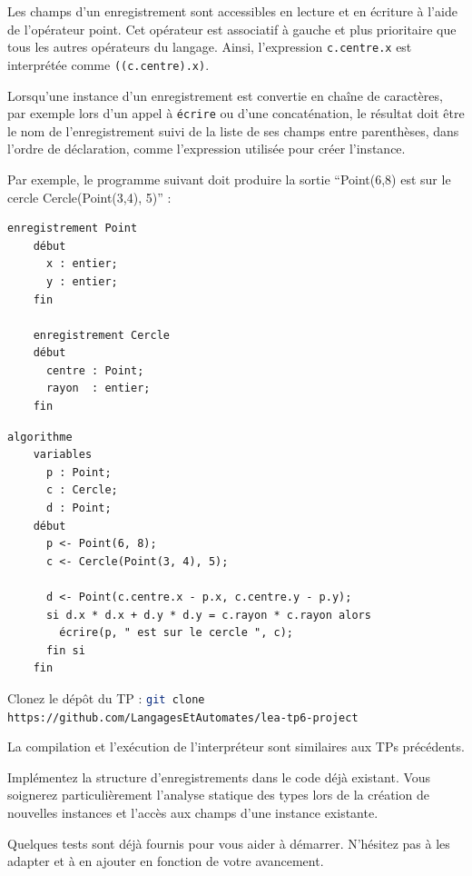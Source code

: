 \documentclass[correction]{td}
\begin{document}
Les champs d'un enregistrement sont accessibles en lecture et en écriture à l'aide de l'opérateur point.
Cet opérateur est associatif à gauche et plus prioritaire que tous les autres opérateurs du langage.
Ainsi, l'expression \lstinline{c.centre.x} est interprétée comme \lstinline{((c.centre).x)}.

Lorsqu'une instance d'un enregistrement est convertie en chaîne de caractères,
par exemple lors d'un appel à \lstinline{écrire} ou d'une concaténation,
le résultat doit être le nom de l'enregistrement suivi de la liste de ses
champs entre parenthèses, dans l'ordre de déclaration,
comme l'expression utilisée pour créer l'instance.

Par exemple, le programme suivant doit produire la sortie ``Point(6,8) est sur le cercle Cercle(Point(3,4), 5)'' :

\begin{minipage}{.3\textwidth}
  \begin{lstlisting}[gobble=2]
    enregistrement Point
    début
      x : entier;
      y : entier;
    fin
    
    enregistrement Cercle
    début
      centre : Point;
      rayon  : entier;
    fin
  \end{lstlisting}
\end{minipage}%
\begin{minipage}{.7\textwidth}
  \begin{lstlisting}[gobble=2]
    algorithme
    variables
      p : Point;
      c : Cercle;
      d : Point;
    début
      p <- Point(6, 8);
      c <- Cercle(Point(3, 4), 5);
    
      d <- Point(c.centre.x - p.x, c.centre.y - p.y);
      si d.x * d.x + d.y * d.y = c.rayon * c.rayon alors
        écrire(p, " est sur le cercle ", c);
      fin si
    fin
  \end{lstlisting}
\end{minipage}%

\vspace{-4mm}
\begin{exercice}

  \begin{question}
  \item Clonez le dépôt du TP : \lstinline[language=bash]{git clone https://github.com/LangagesEtAutomates/lea-tp6-project}

    La compilation et l'exécution de l'interpréteur sont similaires aux TPs précédents.

  \item Implémentez la structure d'enregistrements dans le code déjà existant.
    Vous soignerez particulièrement l'analyse statique des types lors de la création de
    nouvelles instances et l'accès aux champs d'une instance existante. 
    
  \item Quelques tests sont déjà fournis pour vous aider à démarrer.
    N'hésitez pas à les adapter et à en ajouter en fonction de votre avancement. 
    
  \end{question}

\end{exercice}
\end{document}
